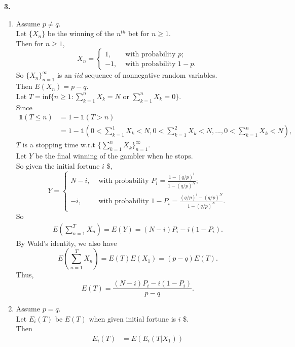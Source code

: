 \documentclass{extarticle}
\newcommand{\idca}{\mathbb{1}}
\theoremstyle{plain}
\theoremstyle{definition}
\begin{document}
\noindent \textbf{3.}\\
\begin{enumerate}
	\item
	  Assume $p \neq q$.\\
	  Let $\{X_n\}$ be the winning of the $n^{th}$ bet for $n \geq 1$.\\
	  Then for $n \geq 1$, 
	  \[ X_n = \left\{ 
	  	  \begin{array}{cc}
	  	  	1,& \text{ with probability }p;\\
	  	  	-1,& \text{ with probability }1-p. 
	  	  \end{array}
	  	  	\right.
	  \]
	  So $\{X_n\}_{n=1}^{\infty}$ is an $iid$ sequence of nonnegative random variables.\\
	  Then $E(X_n) = p-q$.\\
	  Let $T=\text{inf}\{n\geq 1: \sum_{k=1}^{n}X_k = N \text{ or } \sum_{k=1}^{n}X_k = 0\}$.\\
	  Since 
	  \begin{align*}
	  	\idca(T \leq n) &= 1- \idca(T > n) \\
	  					&= 1-\idca(0< \sum_{k=1}^{1}X_k <N, 0< \sum_{k=1}^{2}X_k <N, ..., 0< \sum_{k=1}^{n}X_k <N),
	  \end{align*}
	  $T$ is a stopping time w.r.t $\{\sum_{k=1}^{n}X_k\}_{n=1}^{\infty}$.\\
	  Let $Y$ be the final winning of the gambler when he stops.\\
	  So given the initial fortune $i$ \$, 
	  \[ Y = \left\{ 
	  	  \begin{array}{cc}
	  	  	N-i,& \text{ with probability } P_i = \frac{1-(q/p)^i}{1-(q/p)^N};\\
	  	  	-i,& \text{ with probability } 1-P_i = \frac{(q/p)^i-(q/p)^N}{1-(q/p)^N}. 
	  	  \end{array}
	  	  	\right.
	  \]
	  So 
	  \begin{align*}
  			E\left( \sum_{n=1}^{T}X_n\right) = E(Y) = (N-i)P_i -i(1-P_i).
	  \end{align*}
	  By Wald's identity, we also have
	  \[E\left( \sum_{n=1}^{T}X_n\right) = E(T)E(X_1) = (p-q)E(T).\]
	 Thus,
	 \[E(T) = \frac{(N-i)P_i -i(1-P_i)}{p-q}.\]
	\item
		Assume $p=q$.\\
	  	Let $E_i(T)$ be $E(T)$ when given initial fortune is $i$ \$.\\
	  	Then 
	  	\begin{align*}
	  	  E_i(T) &= E\left(E_i(T|X_1)\right) \\

\end{align*}
\end{enumerate}
\end{document}
